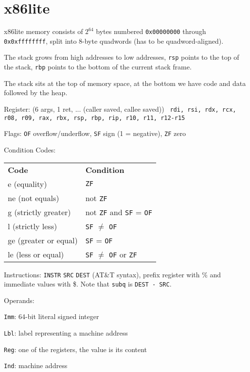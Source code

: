 \section*{x86lite}

x86lite memory consists of $2^{64}$ bytes numbered \texttt{0x00000000} through \texttt{0x0xffffffff}, split into 8-byte quadwords (has to be quadword-aligned). \medskip

The stack grows from high addresses to low addresses, \texttt{rsp} points to the top of the stack, \texttt{rbp} points to the bottom of the current stack frame. \medskip

The stack sits at the top of memory space, at the bottom we have code and data followed by the heap.\medskip

Register: (6 args, 1 ret, ... ({\color{orange}caller saved, \color{blue} callee saved}))
\texttt{\color{orange} rdi, rsi, rdx, rcx, r08, r09, rax, \color{blue} rbx, rsp, rbp, \color{black} rip, \color{orange} r10, r11, \color{blue} r12-r15}\medskip

Flags: \texttt{OF} overflow/underflow, \texttt{SF} sign (1 = negative), \texttt{ZF} zero \medskip

Condition Codes:
\begin{center}
	\begin{tabular}{l l}
		\textbf{Code}         & \textbf{Condition}                            \\
		e (equality)          & \texttt{ZF}                                   \\
		ne (not equals)       & not \texttt{ZF}                               \\
		g (strictly greater)  & not \texttt{ZF} and \texttt{SF} = \texttt{OF} \\
		l (strictly less)     & \texttt{SF} $\neq$ \texttt{OF}                \\
		ge (greater or equal) & \texttt{SF} = \texttt{OF}                     \\
		le (less or equal)    & \texttt{SF} $\neq$ \texttt{OF} or \texttt{ZF} \\
	\end{tabular}
\end{center}

Instructions: \texttt{INSTR} \texttt{SRC} \texttt{DEST} (AT\&T syntax), prefix register with \% and immediate values with \$. Note that \texttt{subq} is \texttt{DEST - SRC}.\medskip

Operands:
\begin{compactitem}[$\quad\bullet$]
	\item \texttt{Imm}: 64-bit literal signed integer
	\item \texttt{Lbl}: label representing a machine address
	\item \texttt{Reg}: one of the registers, the value is its content
	\item \texttt{Ind}: machine address
\end{compactitem} \medskip

